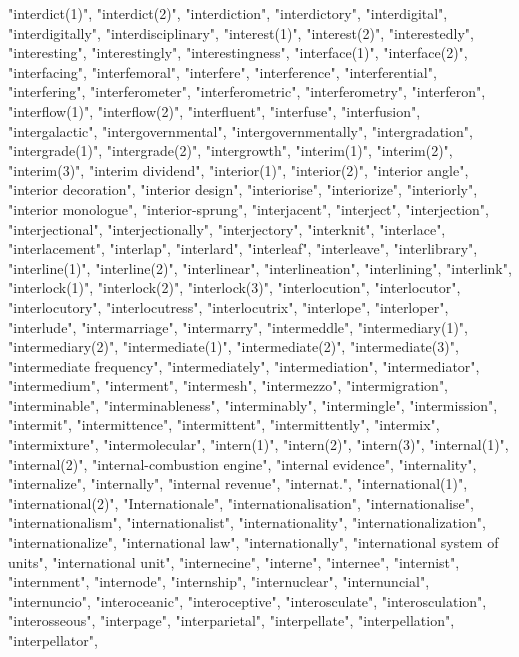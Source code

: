 "interdict(1)",
"interdict(2)",
"interdiction",
"interdictory",
"interdigital",
"interdigitally",
"interdisciplinary",
"interest(1)",
"interest(2)",
"interestedly",
"interesting",
"interestingly",
"interestingness",
"interface(1)",
"interface(2)",
"interfacing",
"interfemoral",
"interfere",
"interference",
"interferential",
"interfering",
"interferometer",
"interferometric",
"interferometry",
"interferon",
"interflow(1)",
"interflow(2)",
"interfluent",
"interfuse",
"interfusion",
"intergalactic",
"intergovernmental",
"intergovernmentally",
"intergradation",
"intergrade(1)",
"intergrade(2)",
"intergrowth",
"interim(1)",
"interim(2)",
"interim(3)",
"interim dividend",
"interior(1)",
"interior(2)",
"interior angle",
"interior decoration",
"interior design",
"interiorise",
"interiorize",
"interiorly",
"interior monologue",
"interior-sprung",
"interjacent",
"interject",
"interjection",
"interjectional",
"interjectionally",
"interjectory",
"interknit",
"interlace",
"interlacement",
"interlap",
"interlard",
"interleaf",
"interleave",
"interlibrary",
"interline(1)",
"interline(2)",
"interlinear",
"interlineation",
"interlining",
"interlink",
"interlock(1)",
"interlock(2)",
"interlock(3)",
"interlocution",
"interlocutor",
"interlocutory",
"interlocutress",
"interlocutrix",
"interlope",
"interloper",
"interlude",
"intermarriage",
"intermarry",
"intermeddle",
"intermediary(1)",
"intermediary(2)",
"intermediate(1)",
"intermediate(2)",
"intermediate(3)",
"intermediate frequency",
"intermediately",
"intermediation",
"intermediator",
"intermedium",
"interment",
"intermesh",
"intermezzo",
"intermigration",
"interminable",
"interminableness",
"interminably",
"intermingle",
"intermission",
"intermit",
"intermittence",
"intermittent",
"intermittently",
"intermix",
"intermixture",
"intermolecular",
"intern(1)",
"intern(2)",
"intern(3)",
"internal(1)",
"internal(2)",
"internal-combustion engine",
"internal evidence",
"internality",
"internalize",
"internally",
"internal revenue",
"internat.",
"international(1)",
"international(2)",
"Internationale",
"internationalisation",
"internationalise",
"internationalism",
"internationalist",
"internationality",
"internationalization",
"internationalize",
"international law",
"internationally",
"international system of units",
"international unit",
"internecine",
"interne",
"internee",
"internist",
"internment",
"internode",
"internship",
"internuclear",
"internuncial",
"internuncio",
"interoceanic",
"interoceptive",
"interosculate",
"interosculation",
"interosseous",
"interpage",
"interparietal",
"interpellate",
"interpellation",
"interpellator",

